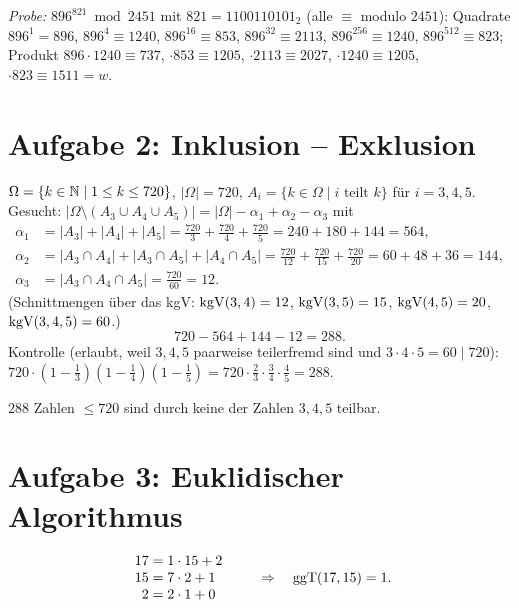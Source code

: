 \emph{Probe:} $896^{821} \bmod 2451$ mit $821 = 1100110101_2$ (alle $\equiv$ modulo $2451$):
Quadrate $896^{1} = 896$, $896^{4} \equiv 1240$, $896^{16} \equiv 853$, $896^{32} \equiv 2113$, $896^{256} \equiv 1240$, $896^{512} \equiv 823$;
Produkt $896 \cdot 1240 \equiv 737$, $\cdot 853 \equiv 1205$, $\cdot 2113 \equiv 2027$, $\cdot 1240 \equiv 1205$, $\cdot 823 \equiv 1511 = w$. \checkmark

\section*{Aufgabe 2: Inklusion -- Exklusion}
$\Omega = \{k \in \mathbb{N} \mid 1 \le k \le 720\}$, $|\Omega| = 720$, $A_i = \{k \in \Omega \mid i \text{ teilt } k\}$ für $i = 3, 4, 5$.
Gesucht: $|\Omega \setminus (A_3 \cup A_4 \cup A_5)| = |\Omega| - \alpha_1 + \alpha_2 - \alpha_3$ mit
\begin{align*}
\alpha_1 &= |A_3| + |A_4| + |A_5| = \tfrac{720}{3} + \tfrac{720}{4} + \tfrac{720}{5} = 240 + 180 + 144 = 564,\\
\alpha_2 &= |A_3 \cap A_4| + |A_3 \cap A_5| + |A_4 \cap A_5| = \tfrac{720}{12} + \tfrac{720}{15} + \tfrac{720}{20} = 60 + 48 + 36 = 144,\\
\alpha_3 &= |A_3 \cap A_4 \cap A_5| = \tfrac{720}{60} = 12 .
\end{align*}
(Schnittmengen über das kgV: $\operatorname{kgV}(3,4) = 12$, $\operatorname{kgV}(3,5) = 15$, $\operatorname{kgV}(4,5) = 20$, $\operatorname{kgV}(3,4,5) = 60$.)
\[
720 - 564 + 144 - 12 = 288 .
\]
Kontrolle (erlaubt, weil $3, 4, 5$ paarweise teilerfremd sind und $3 \cdot 4 \cdot 5 = 60 \mid 720$): $720 \cdot (1 - \tfrac13)(1 - \tfrac14)(1 - \tfrac15) = 720 \cdot \tfrac23 \cdot \tfrac34 \cdot \tfrac45 = 288$.
\begin{ergebnis} $288$ Zahlen $\le 720$ sind durch keine der Zahlen $3, 4, 5$ teilbar. \end{ergebnis}

\section*{Aufgabe 3: Euklidischer Algorithmus}
\[
\begin{array}{r@{\;=\;}l}
17 & 1 \cdot 15 + 2\\
15 & 7 \cdot 2 + 1\\
2 & 2 \cdot 1 + 0
\end{array}
\qquad\Rightarrow\quad \ggT(17, 15) = 1 .
\]

